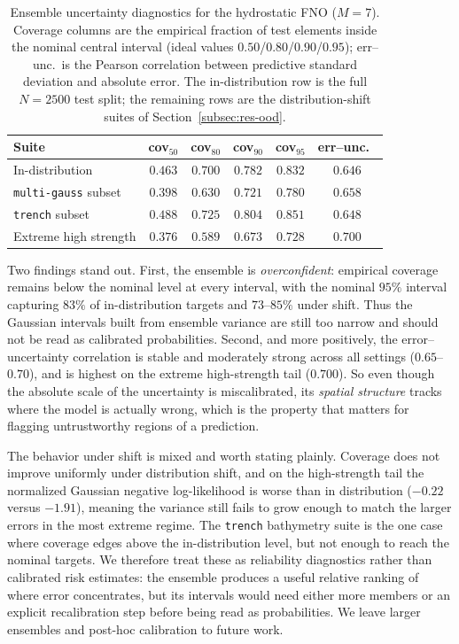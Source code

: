 \begin{table}[H]
\centering
\caption{Ensemble uncertainty diagnostics for the hydrostatic FNO ($M = 7$). Coverage columns are the empirical fraction of test elements inside the nominal central interval (ideal values $0.50$/$0.80$/$0.90$/$0.95$); err--unc.\ is the Pearson correlation between predictive standard deviation and absolute error. The in-distribution row is the full $N = 2500$ test split; the remaining rows are the distribution-shift suites of Section~\ref{subsec:res-ood}.}
\label{tab:uncertainty}
\begin{tabular}{lccccc}
    \toprule
    Suite & cov$_{50}$ & cov$_{80}$ & cov$_{90}$ & cov$_{95}$ & err--unc.\ \\
    \midrule
    In-distribution             & $0.463$ & $0.700$ & $0.782$ & $0.832$ & $0.646$ \\
    \texttt{multi-gauss} subset & $0.398$ & $0.630$ & $0.721$ & $0.780$ & $0.658$ \\
    \texttt{trench} subset      & $0.488$ & $0.725$ & $0.804$ & $0.851$ & $0.648$ \\
    Extreme high strength       & $0.376$ & $0.589$ & $0.673$ & $0.728$ & $0.700$ \\
    \bottomrule
\end{tabular}
\end{table}

Two findings stand out. First, the ensemble is \emph{overconfident}: empirical coverage remains below the nominal level at every interval, with the nominal $95\%$ interval capturing $83\%$ of in-distribution targets and $73$--$85\%$ under shift. Thus the Gaussian intervals built from ensemble variance are still too narrow and should not be read as calibrated probabilities. Second, and more positively, the error--uncertainty correlation is stable and moderately strong across all settings ($0.65$--$0.70$), and is highest on the extreme high-strength tail ($0.700$). So even though the absolute scale of the uncertainty is miscalibrated, its \emph{spatial structure} tracks where the model is actually wrong, which is the property that matters for flagging untrustworthy regions of a prediction.

The behavior under shift is mixed and worth stating plainly. Coverage does not improve uniformly under distribution shift, and on the high-strength tail the normalized Gaussian negative log-likelihood is worse than in distribution ($-0.22$ versus $-1.91$), meaning the variance still fails to grow enough to match the larger errors in the most extreme regime. The \texttt{trench} bathymetry suite is the one case where coverage edges above the in-distribution level, but not enough to reach the nominal targets. We therefore treat these as reliability diagnostics rather than calibrated risk estimates: the ensemble produces a useful relative ranking of where error concentrates, but its intervals would need either more members or an explicit recalibration step before being read as probabilities. We leave larger ensembles and post-hoc calibration to future work.

